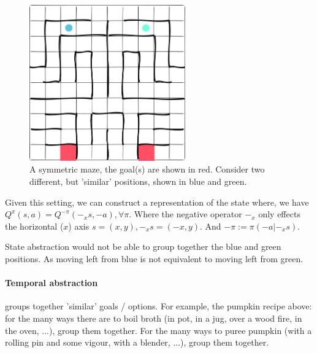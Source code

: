\begin{figure}[h!]
\centering
\includegraphics[width=0.6\textwidth,height=0.3\textheight]{../../pictures/drawings/maze.png}
\caption{A symmetric maze, the goal(s) are shown in red.
Consider two different, but 'similar' positions, shown in blue and green.}
\end{figure}

Given this setting, we can construct a representation of the state \footnotemark where,
we have $Q^{\pi}(s, a) = Q^{-\pi}(-_xs, -a), \forall \pi$.
Where the negative operator $-_x$ only effects the horizontal ($x$) axis $s = (x, y), -_xs = (-x, y)$.
And $-\pi := \pi(-a|-_xs)$. \footnotemark



State abstraction would not be able to group together the blue and green positions.
As moving left from blue is not equivalent to moving left from green.

\paragraph{Temporal abstraction} groups together 'similar' goals / options.
For example, the pumpkin recipe above: for the many ways there are to boil broth
(in pot, in a jug, over a wood fire, in the oven, ...), group them together.
For the many ways to puree pumpkin (with a rolling pin and some vigour, with a blender, ...), group them together.

